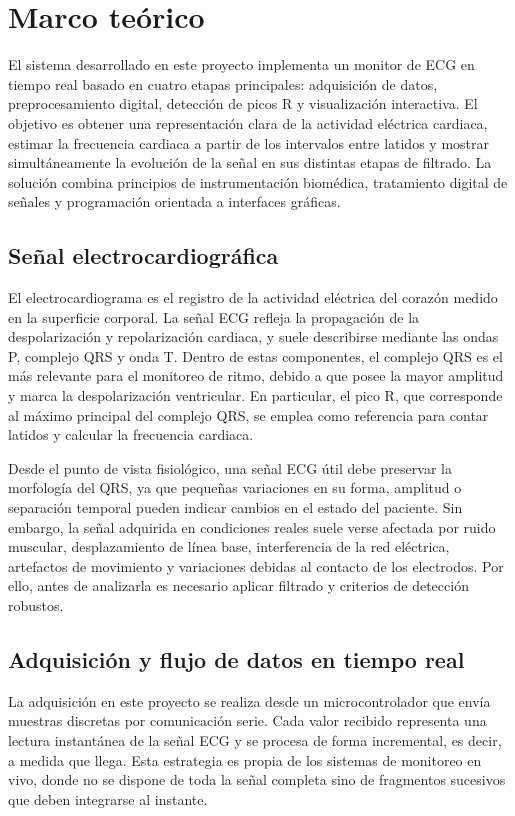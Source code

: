\section{Marco teórico}

El sistema desarrollado en este proyecto implementa un monitor de ECG en tiempo real basado en cuatro etapas principales: adquisición de datos, preprocesamiento digital, detección de picos R y visualización interactiva. El objetivo es obtener una representación clara de la actividad eléctrica cardiaca, estimar la frecuencia cardiaca a partir de los intervalos entre latidos y mostrar simultáneamente la evolución de la señal en sus distintas etapas de filtrado. La solución combina principios de instrumentación biomédica, tratamiento digital de señales y programación orientada a interfaces gráficas.

\subsection{Señal electrocardiográfica}

El electrocardiograma es el registro de la actividad eléctrica del corazón medido en la superficie corporal. La señal ECG refleja la propagación de la despolarización y repolarización cardiaca, y suele describirse mediante las ondas P, complejo QRS y onda T. Dentro de estas componentes, el complejo QRS es el más relevante para el monitoreo de ritmo, debido a que posee la mayor amplitud y marca la despolarización ventricular. En particular, el pico R, que corresponde al máximo principal del complejo QRS, se emplea como referencia para contar latidos y calcular la frecuencia cardiaca.

Desde el punto de vista fisiológico, una señal ECG útil debe preservar la morfología del QRS, ya que pequeñas variaciones en su forma, amplitud o separación temporal pueden indicar cambios en el estado del paciente. Sin embargo, la señal adquirida en condiciones reales suele verse afectada por ruido muscular, desplazamiento de línea base, interferencia de la red eléctrica, artefactos de movimiento y variaciones debidas al contacto de los electrodos. Por ello, antes de analizarla es necesario aplicar filtrado y criterios de detección robustos.

\subsection{Adquisición y flujo de datos en tiempo real}

La adquisición en este proyecto se realiza desde un microcontrolador que envía muestras discretas por comunicación serie. Cada valor recibido representa una lectura instantánea de la señal ECG y se procesa de forma incremental, es decir, a medida que llega. Esta estrategia es propia de los sistemas de monitoreo en vivo, donde no se dispone de toda la señal completa sino de fragmentos sucesivos que deben integrarse al instante.

